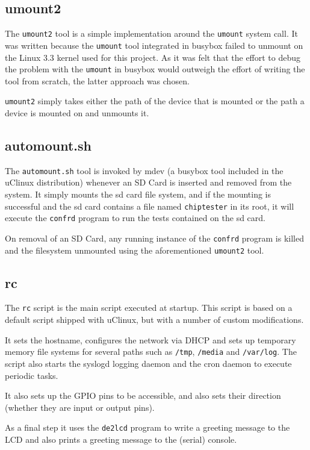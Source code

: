 \subsection{umount2}
The \texttt{umount2} tool is a simple implementation around the \texttt{umount} system call.
It was written because the \texttt{umount} tool integrated in busybox failed to unmount
on the Linux 3.3 kernel used for this project. As it was felt that the effort to debug
the problem with the \texttt{umount} in busybox would outweigh the effort of writing the tool
from scratch, the latter approach was chosen.

\texttt{umount2} simply takes either the path of the device that is mounted or the path
a device is mounted on and unmounts it.


\subsection{automount.sh}
The \texttt{automount.sh} tool is invoked by mdev (a busybox tool included in the uClinux
distribution) whenever an SD Card is inserted and removed
from the system. It simply mounts the sd card file system, and if the mounting is
successful and the sd card contains a file named \texttt{chiptester} in its root, it
will execute the \texttt{confrd} program to run the tests contained on the sd card.

On removal of an SD Card, any running instance of the \texttt{confrd} program is killed
and the filesystem unmounted using the aforementioned \texttt{umount2} tool.


\subsection{rc}
The \texttt{rc} script is the main script executed at startup. This script is based
on a default script shipped with uClinux, but with a number of custom modifications.

It sets the hostname, configures the network via DHCP and sets up temporary memory file
systems for several paths such as \texttt{/tmp}, \texttt{/media} and \texttt{/var/log}. The
script also starts the syslogd logging daemon and the cron daemon to execute periodic tasks.

It also sets up the GPIO pins to be accessible, and also sets their direction (whether
they are input or output pins).

As a final step it uses the \texttt{de2lcd} program to write a greeting message to the LCD
and also prints a greeting message to the (serial) console.


